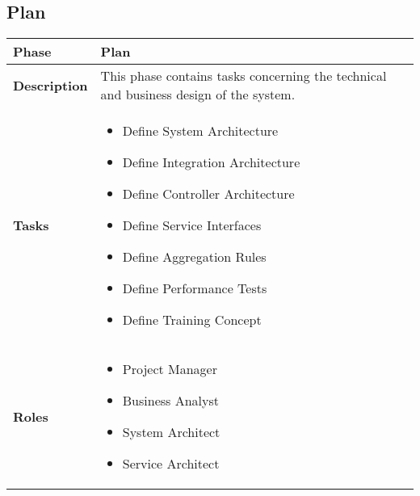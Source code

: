 \subsection{Plan}
\begin{minipage}{\textwidth}
	\label{table:ch6_View_Plan}
	\begin{tabular}
		{|m{2cm}|m{10cm}|} \hline \bfseries Phase & Plan\\
		\hline \bfseries Description & This phase contains tasks concerning the technical and business design of the system.\\
		\hline \bfseries Tasks & 
		\begin{itemize}
			\item Define System Architecture
			\item Define Integration Architecture
			\item Define Controller Architecture
			\item Define Service Interfaces
			\item Define Aggregation Rules
			\item Define Performance Tests
			\item Define Training Concept
		\end{itemize}
		\\
		\hline \bfseries Roles &
		\begin{itemize}
			\item Project Manager
			\item Business Analyst
			\item System Architect
			\item Service Architect
		\end{itemize}
		\\
		\hline 
	\end{tabular}
\end{minipage}

